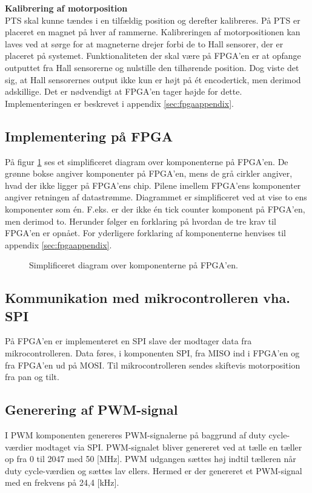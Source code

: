 \textbf{Kalibrering af motorposition}\\
PTS skal kunne tændes i en tilfældig position og derefter kalibreres.
På PTS er placeret en magnet på hver af rammerne.
Kalibreringen af motorpositionen kan laves ved at sørge for at magneterne drejer forbi 
de to Hall sensorer, der er placeret på systemet. 
Funktionaliteten der skal være på FPGA'en er at opfange outputtet fra 
Hall sensorerne og nulstille den tilhørende position.
Dog viste det sig, at Hall sensorernes output ikke kun er højt på ét encodertick, 
men derimod adskillige. Det er nødvendigt at FPGA'en tager højde for 
dette. Implementeringen er beskrevet i appendix \ref{sec:fpgaappendix}.

\subsection{Implementering på FPGA}
På figur \ref{fig:FPGA_blok} ses et simplificeret diagram over komponenterne på FPGA'en. 
De grønne bokse angiver komponenter på FPGA'en, mens de grå cirkler angiver, hvad der ikke ligger på 
FPGA'ens chip. Pilene imellem FPGA'ens komponenter angiver retningen af 
datastrømme. Diagrammet er simplificeret ved at vise to ens komponenter som én. 
F.eks. er der ikke én tick counter komponent på FPGA'en, men derimod to.
Herunder følger en forklaring på hvordan de tre krav til FPGA'en er opnået. For 
yderligere forklaring af komponenterne henvises til appendix 
\ref{sec:fpgaappendix}.

\begin{figure}[!th]
\centering
\begin{tikzpicture}[node distance = 5 cm,scale=1]

\end{tikzpicture}
\caption[Diagram over FPGA komponenter]{Simplificeret diagram over komponenterne på FPGA'en.}
\label{fig:FPGA_blok}
\end{figure}

\subsection[Kommunikation]{Kommunikation med mikrocontrolleren vha. SPI}
På FPGA'en er implementeret en SPI slave der modtager data fra 
mikrocontrolleren. Data føres, i komponenten SPI, fra MISO ind i FPGA'en og fra FPGA'en ud på 
MOSI. Til mikrocontrolleren sendes skiftevis motorposition fra pan og tilt.

\subsection{Generering af PWM-signal}
I PWM komponenten genereres PWM-signalerne på baggrund af duty cycle-værdier modtaget via SPI. 
PWM-signalet bliver genereret ved at tælle en tæller op fra 0 til 2047 med 50 [MHz].
PWM udgangen sættes høj indtil tælleren når duty cycle-værdien og sættes lav 
ellers. Hermed er der genereret et PWM-signal med en frekvens på 24,4 [kHz].

